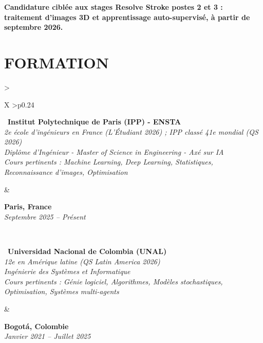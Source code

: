 \documentclass[letterpaper,10pt]{article}
\begin{document}
\textbf{Candidature ciblée aux stages Resolve Stroke postes 2 et 3 : traitement d'images 3D et apprentissage auto-supervisé, à partir de septembre 2026.} 


\vspace{-0.05cm}

\section{\textcolor{mydarkgreen}{\textbf{FORMATION}}}

\begin{tabularx}{\textwidth}{>{\raggedright\arraybackslash}X >{\raggedleft\arraybackslash}p{0.24\textwidth}}
  \begin{minipage}[t]{\linewidth}\raggedright
  \textbullet\ \textbf{Institut Polytechnique de Paris (IPP) - ENSTA}\\
  \textit{\footnotesize 2e école d'ingénieurs en France (L'Étudiant 2026) ; IPP classé 41e mondial (QS 2026)}\\
  \textit{\footnotesize Diplôme d'Ingénieur - Master of Science in Engineering - Axé sur IA}\\
  \textit{\footnotesize Cours pertinents : Machine Learning, Deep Learning, Statistiques, Reconnaissance d'images, Optimisation}
  \end{minipage}
  &
  \begin{minipage}[t]{\linewidth}\raggedleft
  \textbf{Paris, France}\\
  {\footnotesize\textit{Septembre 2025 -- Présent}}
  \end{minipage}
  \\
  \begin{minipage}[t]{\linewidth}
  \textbullet\ \textbf{Universidad Nacional de Colombia (UNAL)}\\
  \textit{\footnotesize 12e en Amérique latine (QS Latin America 2026)}\\
  \textit{\footnotesize Ingénierie des Systèmes et Informatique}\\
  \textit{\footnotesize Cours pertinents : Génie logiciel, Algorithmes, Modèles stochastiques, Optimisation, Systèmes multi-agents}
  \end{minipage}
  &
  \begin{minipage}[t]{\linewidth}\raggedleft
  \textbf{Bogotá, Colombie}\\
  {\footnotesize\textit{Janvier 2021 -- Juillet 2025}}

\end{minipage}
\end{tabularx}
\end{document}
